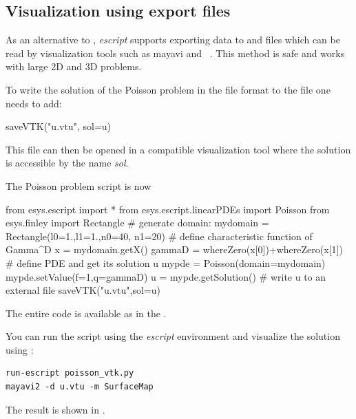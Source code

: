 \subsection{Visualization using export files}

As an alternative to \MATPLOTLIB, {\it escript} supports exporting data to
\VTK and \SILO files which can be read by visualization tools such as
mayavi\cite{mayavi} and \VisIt~\cite{VisIt}. This method is \MPI safe and
works with large 2D and 3D problems.

To write the solution  of the Poisson problem in the \VTK file format
to the file  one needs to add:
\begin{python}
  saveVTK("u.vtu", sol=u)
\end{python}
This file can then be opened in a \VTK compatible visualization tool where the
solution is accessible by the name {\it sol}.

The Poisson problem script is now 
\begin{python}
  from esys.escript import *
  from esys.escript.linearPDEs import Poisson
  from esys.finley import Rectangle
  # generate domain:
  mydomain = Rectangle(l0=1.,l1=1.,n0=40, n1=20)
  # define characteristic function of Gamma^D
  x = mydomain.getX()
  gammaD = whereZero(x[0])+whereZero(x[1])
  # define PDE and get its solution u
  mypde = Poisson(domain=mydomain)
  mypde.setValue(f=1,q=gammaD)
  u = mypde.getSolution()
  # write u to an external file
  saveVTK("u.vtu",sol=u)
\end{python}
The entire code is available as  in the \ExampleDirectory.

You can run the script using the {\it escript} environment and visualize the
solution using \mayavi:
\begin{verbatim}
run-escript poisson_vtk.py
mayavi2 -d u.vtu -m SurfaceMap
\end{verbatim}
The result is shown in .

